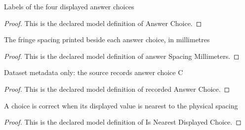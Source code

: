 \begin{definition}
  \label{def:physics:phyx-mini-0125:phyxminiproblems-problemphyxmini0125-answerchoice}
  Labels of the four displayed answer choices
\end{definition}
\begin{proof}
  This is the declared model definition of Answer Choice.
\end{proof}
\begin{definition}
  \label{def:physics:phyx-mini-0125:phyxminiproblems-problemphyxmini0125-answerspacingmillimeters}
  The fringe spacing printed beside each answer choice, in millimetres
\end{definition}
\begin{proof}
  This is the declared model definition of answer Spacing Millimeters.
\end{proof}
\begin{definition}
  \label{def:physics:phyx-mini-0125:phyxminiproblems-problemphyxmini0125-recordedanswerchoice}
  Dataset metadata only: the source records answer choice C
\end{definition}
\begin{proof}
  This is the declared model definition of recorded Answer Choice.
\end{proof}
\begin{definition}
  \label{def:physics:phyx-mini-0125:phyxminiproblems-problemphyxmini0125-isnearestdisplayedchoice}
  A choice is correct when its displayed value is nearest to the physical spacing
\end{definition}
\begin{proof}
  This is the declared model definition of Is Nearest Displayed Choice.
\end{proof}
